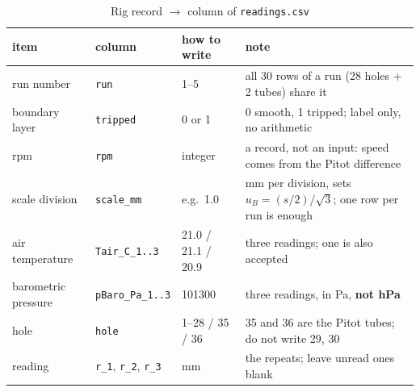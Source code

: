 \documentclass[11pt,a4paper]{article}
\begin{document}
\begin{table}[H]
\centering
\caption{Rig record $\rightarrow$ column of \texttt{readings.csv}}
\small
\begin{tabularx}{\textwidth}{@{}p{3.0cm} p{3.6cm} p{2.5cm} X@{}}
\toprule
item & column & how to write & note \\
\midrule
run number & \texttt{run} & 1--5 & all 30 rows of a run (28 holes + 2 tubes) share it \\
boundary layer & \texttt{tripped} & 0 or 1 & 0 smooth, 1 tripped; label only, no arithmetic \\
rpm & \texttt{rpm} & integer & a record, not an input: speed comes from the Pitot difference \\
scale division & \texttt{scale\_mm} & e.g.\ 1.0 & mm per division, sets $u_B=(s/2)/\sqrt{3}$; one row per run is enough \\
air temperature & \texttt{Tair\_C\_1..3} & 21.0 / 21.1 / 20.9 & three readings; one is also accepted \\
barometric pressure & \texttt{pBaro\_Pa\_1..3} & 101300 & three readings, in Pa, \textbf{not hPa} \\
hole & \texttt{hole} & 1--28 / 35 / 36 & 35 and 36 are the Pitot tubes; do not write 29, 30 \\
reading & \texttt{r\_1}, \texttt{r\_2}, \texttt{r\_3} & mm & the repeats; leave unread ones blank \\
\bottomrule
\end{tabularx}
\end{table}
\end{document}
